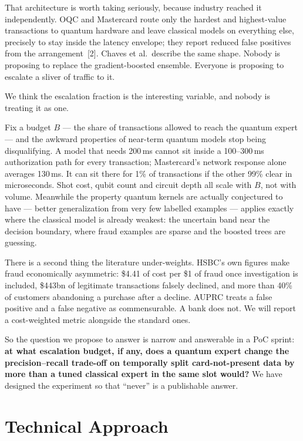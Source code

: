\documentclass[10pt,a4paper]{article}
\begin{document}
That architecture is worth taking seriously, because industry reached it independently. OQC and Mastercard route only the hardest and highest-value transactions to quantum hardware and leave classical models on everything else, precisely to stay inside the latency envelope; they report reduced false positives from the arrangement~[2]. Chaves et al.\ describe the same shape. Nobody is proposing to replace the gradient-boosted ensemble. Everyone is proposing to escalate a sliver of traffic to it.

We think the escalation fraction is the interesting variable, and nobody is treating it as one.

Fix a budget $B$ --- the share of transactions allowed to reach the quantum expert --- and the awkward properties of near-term quantum models stop being disqualifying. A model that needs 200\,ms cannot sit inside a 100--300\,ms authorization path for every transaction; Mastercard's network response alone averages 130\,ms. It can sit there for 1\% of transactions if the other 99\% clear in microseconds. Shot cost, qubit count and circuit depth all scale with $B$, not with volume. Meanwhile the property quantum kernels are actually conjectured to have --- better generalization from very few labelled examples --- applies exactly where the classical model is already weakest: the uncertain band near the decision boundary, where fraud examples are sparse and the boosted trees are guessing.

There is a second thing the literature under-weights. HSBC's own figures make fraud economically asymmetric: \$4.41 of cost per \$1 of fraud once investigation is included, \$443bn of legitimate transactions falsely declined, and more than 40\% of customers abandoning a purchase after a decline. AUPRC treats a false positive and a false negative as commensurable. A bank does not. We will report a cost-weighted metric alongside the standard ones.

So the question we propose to answer is narrow and answerable in a PoC sprint: \textbf{at what escalation budget, if any, does a quantum expert change the precision--recall trade-off on temporally split card-not-present data by more than a tuned classical expert in the same slot would?} We have designed the experiment so that ``never'' is a publishable answer.

\section{Technical Approach}
\end{document}
